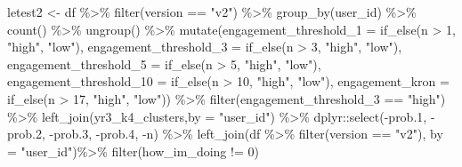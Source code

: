 \documentclass[
]{article}
\newenvironment{Shaded}{\begin{snugshade}}{\end{snugshade}}
\newcommand{\AttributeTok}[1]{\textcolor[rgb]{0.77,0.63,0.00}{#1}}
\newcommand{\DecValTok}[1]{\textcolor[rgb]{0.00,0.00,0.81}{#1}}
\newcommand{\FloatTok}[1]{\textcolor[rgb]{0.00,0.00,0.81}{#1}}
\newcommand{\FunctionTok}[1]{\textcolor[rgb]{0.00,0.00,0.00}{#1}}
\newcommand{\NormalTok}[1]{#1}
\newcommand{\OtherTok}[1]{\textcolor[rgb]{0.56,0.35,0.01}{#1}}
\newcommand{\SpecialCharTok}[1]{\textcolor[rgb]{0.00,0.00,0.00}{#1}}
\newcommand{\StringTok}[1]{\textcolor[rgb]{0.31,0.60,0.02}{#1}}
\begin{document}
\begin{Shaded}
\begin{Highlighting}[]
\NormalTok{letest2 }\OtherTok{\textless{}{-}}\NormalTok{  df }\SpecialCharTok{\%\textgreater{}\%}
  \FunctionTok{filter}\NormalTok{(version }\SpecialCharTok{==} \StringTok{"v2"}\NormalTok{) }\SpecialCharTok{\%\textgreater{}\%}
  \FunctionTok{group\_by}\NormalTok{(user\_id) }\SpecialCharTok{\%\textgreater{}\%}
  \FunctionTok{count}\NormalTok{() }\SpecialCharTok{\%\textgreater{}\%}
  \FunctionTok{ungroup}\NormalTok{() }\SpecialCharTok{\%\textgreater{}\%} 
  \FunctionTok{mutate}\NormalTok{(}\AttributeTok{engagement\_threshold\_1 =} \FunctionTok{if\_else}\NormalTok{(n }\SpecialCharTok{\textgreater{}} \DecValTok{1}\NormalTok{, }\StringTok{"high"}\NormalTok{, }\StringTok{"low"}\NormalTok{),}
         \AttributeTok{engagement\_threshold\_3 =} \FunctionTok{if\_else}\NormalTok{(n }\SpecialCharTok{\textgreater{}} \DecValTok{3}\NormalTok{, }\StringTok{"high"}\NormalTok{, }\StringTok{"low"}\NormalTok{),}
         \AttributeTok{engagement\_threshold\_5 =} \FunctionTok{if\_else}\NormalTok{(n }\SpecialCharTok{\textgreater{}} \DecValTok{5}\NormalTok{, }\StringTok{"high"}\NormalTok{, }\StringTok{"low"}\NormalTok{),}
         \AttributeTok{engagement\_threshold\_10 =} \FunctionTok{if\_else}\NormalTok{(n }\SpecialCharTok{\textgreater{}} \DecValTok{10}\NormalTok{, }\StringTok{"high"}\NormalTok{, }\StringTok{"low"}\NormalTok{),}
         \AttributeTok{engagement\_kron =} \FunctionTok{if\_else}\NormalTok{(n }\SpecialCharTok{\textgreater{}} \DecValTok{17}\NormalTok{, }\StringTok{"high"}\NormalTok{, }\StringTok{"low"}\NormalTok{)) }\SpecialCharTok{\%\textgreater{}\%} 
  \FunctionTok{filter}\NormalTok{(engagement\_threshold\_3 }\SpecialCharTok{==} \StringTok{"high"}\NormalTok{) }\SpecialCharTok{\%\textgreater{}\%} 
  \FunctionTok{left\_join}\NormalTok{(yr3\_k4\_clusters,}\AttributeTok{by =} \StringTok{"user\_id"}\NormalTok{) }\SpecialCharTok{\%\textgreater{}\%} 
\NormalTok{  dplyr}\SpecialCharTok{::}\FunctionTok{select}\NormalTok{(}\SpecialCharTok{{-}}\NormalTok{prob}\FloatTok{.1}\NormalTok{,}
          \SpecialCharTok{{-}}\NormalTok{prob}\FloatTok{.2}\NormalTok{,}
          \SpecialCharTok{{-}}\NormalTok{prob}\FloatTok{.3}\NormalTok{,}
          \SpecialCharTok{{-}}\NormalTok{prob}\FloatTok{.4}\NormalTok{,}
          \SpecialCharTok{{-}}\NormalTok{n) }\SpecialCharTok{\%\textgreater{}\%} 
  \FunctionTok{left\_join}\NormalTok{(df }\SpecialCharTok{\%\textgreater{}\%} 
  \FunctionTok{filter}\NormalTok{(version }\SpecialCharTok{==} \StringTok{"v2"}\NormalTok{),}
         \AttributeTok{by =} \StringTok{"user\_id"}\NormalTok{)}\SpecialCharTok{\%\textgreater{}\%}
  \FunctionTok{filter}\NormalTok{(how\_im\_doing }\SpecialCharTok{!=} \DecValTok{0}\NormalTok{)}



\end{Highlighting}
\end{Shaded}
\end{document}
